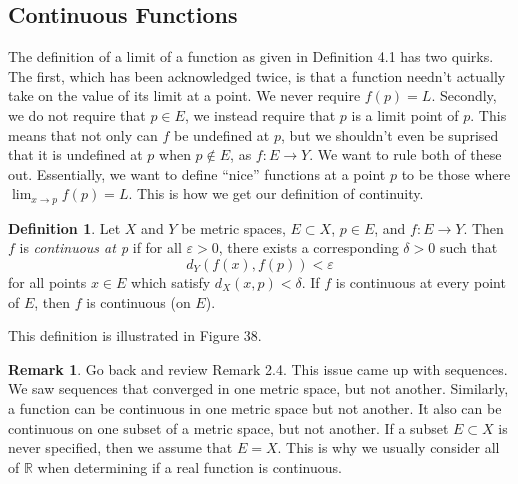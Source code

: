 \documentclass{article}
\newcommand{\R}{\mathbb{R}}
\theoremstyle{definition}
\newtheorem{definition}{Definition}[section]
\newtheorem{remark}{Remark}[section]
\begin{document}
\subsection{Continuous Functions}
The definition of a limit of a function as given in Definition 4.1 has two quirks. The first, which has been acknowledged twice, is that a function needn't actually take on the value of its limit at a point. We never require $ f(p)=L $. Secondly, we do not require that $ p\in E $, we instead require that $ p $ is a limit point of $ p $. This means that not only can $ f $ be undefined at $ p $, but we shouldn't even be suprised that it is undefined at $ p $ when $ p\notin E $, as $ f:E\to Y $. We want to rule both of these out. Essentially, we want to define ``nice'' functions at a point $ p $ to be those where $ \lim_{x\to p}f(p)=L $. This is how we get our definition of continuity. 
\begin{definition}
	Let $ X $ and $ Y $ be metric spaces,  $ E\subset X $, $ p\in E $, and $ f:E\to Y $. Then $ f $ is \textit{\color{red}continuous at p} if for all $ \varepsilon>0 $, there exists a corresponding $ \delta>0 $ such that $$ d_Y(f(x),f(p))<\varepsilon $$ for all points $ x\in E $ which satisfy $ d_X(x,p)<\delta $. If $ f $ is continuous at every point of $ E $, then $ f $ is {\color{red}continuous (on $ E $)}. 
\end{definition}
This definition is illustrated in Figure 38.
\begin{remark}
Go back and review Remark 2.4. This issue came up with sequences. We saw sequences that converged in one metric space, but not another. Similarly, a function can be continuous in one metric space but not another. It also can be continuous on one subset of a metric space, but not another. If a subset $ E\subset X $ is never specified, then we assume that $ E=X $. This is why we usually consider all of $ \R $ when determining if a real function is continuous.
\end{remark}
\end{document}
